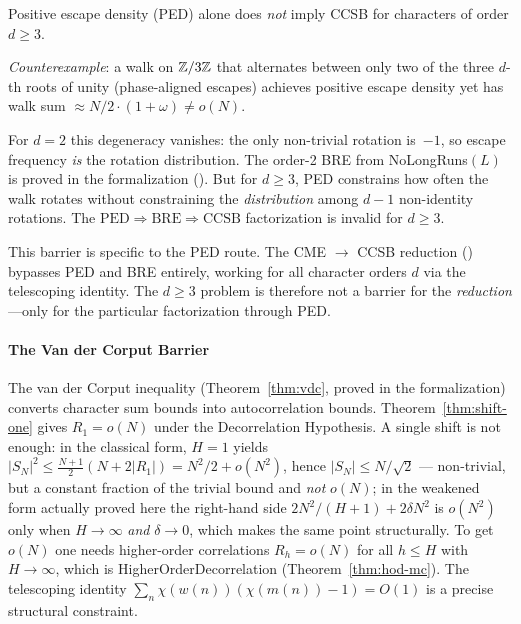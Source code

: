 \begin{deadend}[title={Dead End: PED $\not\Rightarrow$ CCSB for $d \geq 3$}]
\begin{remark}\label{rem:bre-impossible}
Positive escape density (PED) alone does \emph{not} imply
CCSB for characters of order $d \geq 3$.

\emph{Counterexample}: a walk on $\mathbb{Z}/3\mathbb{Z}$ that alternates between
only two of the three $d$-th roots of unity (phase-aligned escapes)
achieves positive escape density yet has walk sum
$\approx N/2 \cdot (1 + \omega) \neq o(N)$.

For $d = 2$ this degeneracy vanishes: the only non-trivial rotation
is~$-1$, so escape frequency \emph{is} the rotation distribution.
The order-2 BRE from NoLongRuns$(L)$ is proved in the formalization
().
But for $d \geq 3$, PED constrains how often the walk rotates without
constraining the \emph{distribution} among $d-1$ non-identity
rotations.  The $\mathrm{PED} \Rightarrow \mathrm{BRE} \Rightarrow
\mathrm{CCSB}$ factorization is invalid for $d \geq 3$.

This barrier is specific to the PED route.  The CME $\to$ CCSB
reduction ()
bypasses PED and BRE entirely, working for all character orders $d$
via the telescoping identity.  The $d \geq 3$ problem is therefore
not a barrier for the \emph{reduction}---only for the particular
factorization through PED.
\end{remark}
\end{deadend}

\paragraph{The Van der Corput Barrier}

The van der Corput inequality (Theorem~\ref{thm:vdc}, proved in the
formalization) converts character sum bounds into autocorrelation
bounds.  Theorem~\ref{thm:shift-one} gives $R_1 = o(N)$ under the
Decorrelation Hypothesis.  A single shift is not enough: in the classical
form, $H = 1$ yields
$|S_N|^2 \leq \frac{N+1}{2}(N + 2|R_1|) = N^2/2 + o(N^2)$, hence
$|S_N| \leq N/\sqrt{2}$ --- non-trivial, but a constant fraction of the
trivial bound and \emph{not} $o(N)$; in the weakened form actually proved
here the right-hand side $2N^2/(H+1) + 2\delta N^2$ is $o(N^2)$ only when
$H \to \infty$ \emph{and} $\delta \to 0$, which makes the same point
structurally.  To get $o(N)$ one needs higher-order correlations
$R_h = o(N)$ for all $h \leq H$ with $H \to \infty$, which is
HigherOrderDecorrelation (Theorem~\ref{thm:hod-mc}).
The telescoping identity $\sum_n \chi(w(n))(\chi(m(n))-1) = O(1)$
is a precise structural constraint.

